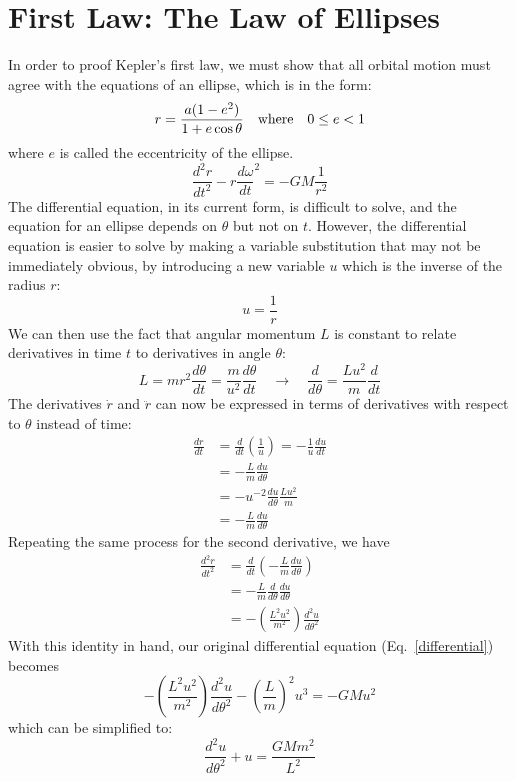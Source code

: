 \documentclass[11pt]{article}
\begin{document}
\section{First Law: The Law of Ellipses}
In order to proof Kepler's first law, we must show that all orbital motion must
agree with the equations of an ellipse, which is in the form:
\begin{equation}
  r=\frac{a(1-e^2)}{1+e\cos\theta}
  \quad\textnormal{\normalsize where}\quad
  0\leq e < 1
\end{equation}
where $e$ is called the eccentricity of the ellipse.
\begin{equation}
  \frac{d^2r}{dt^2} - r\frac{d\omega}{dt}^2 = -GM\frac{1}{r^2}
  \label{differential}
\end{equation}
The differential equation, in its current form, is difficult to solve, and the
equation for an ellipse depends on $\theta$ but not on $t$. However, the
differential equation is easier to solve by making a variable substitution that
may not be immediately obvious, by introducing a new variable $u$ which is
the inverse of the radius $r$:
\begin{equation}
  u=\frac{1}{r}
\end{equation}
We can then use the fact that angular momentum $L$ is constant to relate
derivatives in time $t$ to derivatives in angle $\theta$:
\begin{equation}
  L=mr^2\frac{d\theta}{dt}=\frac{m}{u^2}\frac{d\theta}{dt}
  \quad\longrightarrow\quad
  \frac{d}{d\theta}=\frac{Lu^2}{m}\frac{d}{dt}
\end{equation}
The derivatives $\dot{r}$ and $\ddot{r}$ can now be expressed in terms of
derivatives with respect to $\theta$ instead of time:
\begin{align}
  \frac{dr}{dt} &=\frac{d}{dt}\left(\frac{1}{u}\right)
  =-\frac{1}{u}\frac{du}{dt}\\
  &=-\frac{L}{m}\frac{du}{d\theta}\\
  &= -u^{-2}\frac{du}{d\theta} \frac{Lu^2}{m} \\
  &= -\frac{L}{m}\frac{du}{d\theta}
\end{align}
Repeating the same process for the second derivative, we have
\begin{align}
  \frac{d^2r}{dt^2} &= \frac{d}{dt}\left(-\frac{L}{m}\frac{du}{d\theta}\right)\\
  &= -\frac{L}{m} \frac{d}{d\theta}\frac{du}{d\theta} \\
  &= -\left(\frac{L^2u^2}{m^2}\right)\frac{d^2u}{d\theta^2}
\end{align}
With this identity in hand, our original differential equation
(Eq.\ \ref{differential}) becomes
\begin{equation}
  -\left(\frac{L^2u^2}{m^2}\right)\frac{d^2u}{d\theta^2} - \left(\frac{L}{m}\right)^2u^3 = -GMu^2
\end{equation}
which can be simplified to:
\begin{equation}
  \frac{d^2u}{d\theta^2} + u = \frac{GMm^2}{L^2}
  \label{newdiff}
\end{equation}
\end{document}
